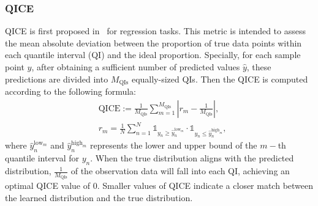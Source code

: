\subsubsection*{\textbf{QICE}} QICE is first proposed in~\cite{han2022card} for regression tasks. This metric is intended to assess the mean absolute deviation between the proportion of true data points within each quantile interval (QI) and the ideal proportion. Specially, for each sample point \(y\), after obtaining a sufficient number of predicted values \(\hat{y}\), these predictions are divided into \(M_{\text{QIs}}\) equally-sized QIs. Then the QICE is computed according to the following formula:
\begin{equation}
\begin{aligned}
    &\text{QICE} := \frac{1}{M_{\text{QIs}}} \sum_{m=1}^{M_{\text{QIs}}} \left| r_m - \frac{1}{M_{\text{QIs}}} \right|,\\
    &r_m = \frac{1}{N} \sum_{n=1}^{N} \mathbb{1}_{y_n \geq \hat{y}_n^{\text{low}_m}} \cdot \mathbb{1}_{y_n \leq \hat{y}_n^{\text{high}_m}},
\end{aligned}
\end{equation}
where $\hat{y}_n^{\text{low}_m}$ and $\hat{y}_n^{\text{high}_m}$ represents the lower and upper bound of the $m-$th quantile interval for $y_n$. When the true distribution aligns with the predicted distribution, \(\frac{1}{M_{\text{QIs}}}\) of the observation data will fall into each QI, achieving an optimal QICE value of 0. Smaller values of QICE indicate a closer match between the learned distribution and the true distribution.


